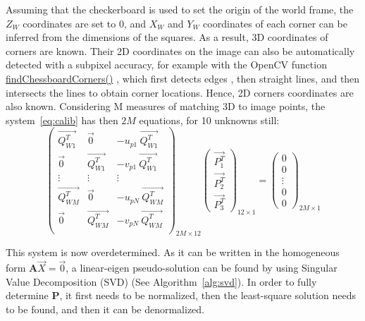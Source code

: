 Assuming that the checkerboard is used to set the origin of the world frame, the $Z_W$ coordinates are set to 0, and $X_W$ and $Y_W$ coordinates of each corner can be inferred from the dimensions of the squares. As a result, 3D coordinates of corners are known. Their 2D coordinates on the image can also be automatically detected with a subpixel accuracy, for example with the OpenCV function \href{https://docs.opencv.org/4.x/d9/d0c/group__calib3d.html#ga93efa9b0aa890de240ca32b11253dd4a}{findChessboardCorners()} \cite{Bradski2000}, which first detects edges \cite{Canny1986}, then straight lines, and then intersects the lines to obtain corner locations. Hence, 2D corners coordinates are also known. Considering M measures of matching 3D to image points, the system~\ref{eq:calib} has then $2M$ equations, for 10 unknowns still:
\begin{equation}
  \begin{pmatrix}
    \overrightarrow{Q_{W1}^T} & \overrightarrow{0} & - u_{p1} \ \overrightarrow{Q_{W1}^T}\\   
    \overrightarrow{0} & \overrightarrow{Q_{W1}^T} & - v_{p1} \ \overrightarrow{Q_{W1}^T} \\ 
    \vdots & \vdots & \vdots\\
    \overrightarrow{Q_{WM}^T} & \overrightarrow{0} & - u_{pN} \ \overrightarrow{Q_{WM}^T}\\   
    \overrightarrow{0} & \overrightarrow{Q_{WM}^T} & - v_{pN} \ \overrightarrow{Q_{WM}^T} \\ 
  \end{pmatrix}_{\!\!2M\times 12}
  \begin{pmatrix} \overrightarrow{P_1^T} \\ \overrightarrow{P_2^T} \\ \overrightarrow{P_3^T} \end{pmatrix}_{\!\!12\times 1}
  = \begin{pmatrix} 0 \\ 0 \\ \vdots \\ 0 \\ 0 \end{pmatrix}_{\!\!2M\times 1}
\end{equation}

This system is now overdetermined. As it can be written in the homogeneous form \(\textbf{A} \overrightarrow{X} = \overrightarrow{0}\), a linear-eigen pseudo-solution can be found \cite{Hartley2003} by using Singular Value Decomposition (SVD) \cite{Golub1971} (See Algorithm~\ref{alg:svd}). In order to fully determine $\textbf{P}$, it first needs to be normalized, then the least-square solution needs to be found, and then it can be denormalized. 


